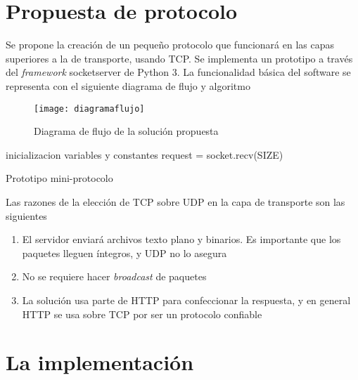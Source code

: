 \documentclass{article}
\begin{document}
\section{Propuesta de protocolo}

Se propone la creación de un pequeño protocolo que funcionará en las capas superiores a la de transporte, usando TCP. Se implementa un prototipo a través del \textit{framework} socketserver de Python 3\cite{web_python3_socketserver}. La funcionalidad básica del software se representa con el siguiente diagrama de flujo y algoritmo

\begin{figure}[hp]
\centering
\texttt{[image: diagramaflujo]}
\caption{Diagrama de flujo de la solución propuesta}
\end{figure}

\begin{algorithm}[H]
\SetAlgoLined
{}
 inicializacion variables y constantes\;
 request = socket.recv(SIZE)\;
\caption{Prototipo mini-protocolo}
\end{algorithm}

Las razones de la elección de TCP sobre UDP en la capa de transporte son las siguientes

\begin{enumerate}
\item El servidor enviará archivos texto plano y binarios. Es importante que los paquetes lleguen íntegros, y UDP no lo asegura
\item No se requiere hacer \textit{broadcast} de paquetes
\item La solución usa parte de HTTP para confeccionar la respuesta, y en general HTTP se usa sobre TCP por ser un protocolo confiable\cite{rfc_2616}
\end{enumerate}

\section{La implementación}
\end{document}
